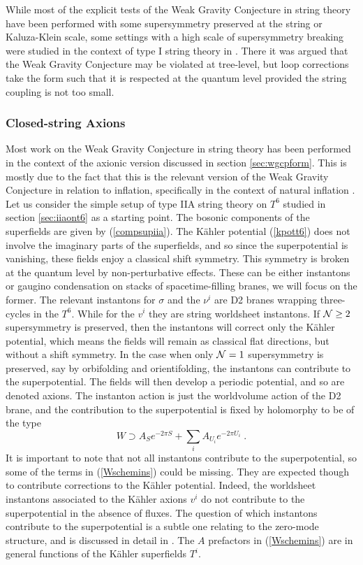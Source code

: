 \documentclass[11pt,a4paper]{article}
\numberwithin{equation}{section}
\numberwithin{table}{section}\setlength{\multlinegap}{25pt}
\newcommand{\be}{\begin{equation}}
\newcommand{\ee}{\end{equation}}
\begin{document}
While most of the explicit tests of the Weak Gravity Conjecture in string theory have been performed with some supersymmetry preserved at the string or Kaluza-Klein scale, some settings with a high scale of supersymmetry breaking were studied in the context of type I string theory in \cite{Bonnefoy:2018mqb}. There it was argued that the Weak Gravity Conjecture may be violated at tree-level, but loop corrections take the form such that it is respected at the quantum level provided the string coupling is not too small. 


\subsubsection{Closed-string Axions}
\label{sec:wgcax}

Most work on the Weak Gravity Conjecture in string theory has been performed in the context of the axionic version discussed in section \ref{sec:wgcpform}. This is mostly due to the fact that this is the relevant version of the Weak Gravity Conjecture in relation to inflation, specifically in the context of natural inflation \cite{Freese:1990rb}. Let us consider the simple setup of type IIA string theory on $T^6$ studied in section \ref{sec:iiaont6} as a starting point. The bosonic components of the superfields are given by (\ref{compsupiia}). The K{\"a}hler potential (\ref{kpott6}) does not involve the imaginary parts of the superfields, and so since the superpotential is vanishing, these fields enjoy a classical shift symmetry. This symmetry is broken at the quantum level by non-perturbative effects. These can be either instantons or gaugino condensation on stacks of spacetime-filling branes, we will focus on the former. The relevant instantons for $\sigma$ and the $\nu^i$ are D2 branes wrapping three-cycles in the $T^6$. While for the $v^i$ they are string worldsheet instantons. If ${\cal N} \geq 2$ supersymmetry is preserved, then the instantons will correct only the K{\"a}hler potential, which means the fields will remain as classical flat directions, but without a shift symmetry. In the case when only ${\cal N}=1$ supersymmetry is preserved, say by orbifolding and orientifolding, the instantons can contribute to the superpotential. The fields will then develop a periodic potential, and so are denoted axions. The instanton action is just the worldvolume action of the D2 brane, and the contribution to the superpotential is fixed by holomorphy to be of the type
\be
W \supset A_{S} e^{-2\pi S} + \sum_i A_{U_i} e^{-2 \pi U_i} \;.
\label{Wschemins}
\ee
It is important to note that not all instantons contribute to the superpotential, so some of the terms in (\ref{Wschemins}) could be missing. They are expected though to contribute corrections to the K{\"a}hler potential. Indeed, the worldsheet instantons associated to the K{\"a}hler axions $v^i$ do not contribute to the superpotential in the absence of fluxes. The question of which instantons contribute to the superpotential is a subtle one relating to the zero-mode structure, and is discussed in detail in \cite{Blumenhagen:2009qh}. The $A$ prefactors in (\ref{Wschemins}) are in general functions of the K{\"a}hler superfields $T^i$. 
\end{document}
